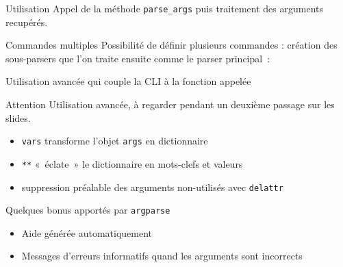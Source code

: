\begin{frame}{Utilisation}
  Appel de la méthode \texttt{parse\_args} puis traitement des arguments recupérés.

\end{frame}

\begin{frame}{Commandes multiples}
  Possibilité de définir plusieurs commandes : création des sous-parsers que l'on traite ensuite comme le parser principal~:

\end{frame}

\begin{frame}{Utilisation avancée qui couple la CLI à la fonction appelée}
  \begin{alertblock}{Attention}
    Utilisation avancée, à regarder pendant un deuxième passage sur les slides.
  \end{alertblock}

  \begin{itemize}
    \item \texttt{vars} transforme l'objet \texttt{args} en dictionnaire
    \item \texttt{**} «~éclate~» le dictionnaire en mots-clefs et valeurs
    \item suppression préalable des arguments non-utilisés avec \texttt{delattr}
  \end{itemize}
\end{frame}

\begin{frame}{Quelques bonus apportés par \texttt{argparse}}
  \begin{itemize}[<+->]
    \item Aide générée automatiquement
    \item Messages d'erreurs informatifs quand les arguments sont incorrects
  \end{itemize}
\end{frame}
